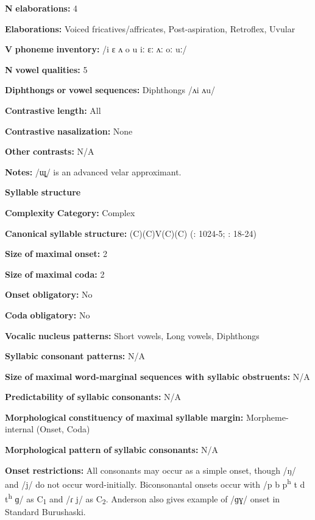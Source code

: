 \begin{styleBody}
\textbf{N} \textbf{elaborations:} 4

\textbf{Elaborations:} Voiced fricatives/affricates, Post-aspiration, Retroflex, Uvular

\textbf{V} \textbf{phoneme} \textbf{inventory:} /i ɛ ʌ o u iː ɛː ʌː oː uː/

\textbf{N} \textbf{vowel} \textbf{qualities:} 5

\textbf{Diphthongs} \textbf{or} \textbf{vowel} \textbf{sequences:} Diphthongs /ʌi ʌu/

\textbf{Contrastive} \textbf{length:} All

\textbf{Contrastive} \textbf{nasalization:} None

\textbf{Other} \textbf{contrasts:} N/A

\textbf{Notes:} /ɰ̟/ is an advanced velar approximant.

\textbf{Syllable} \textbf{structure}

\textbf{Complexity} \textbf{Category:} Complex

\textbf{Canonical} \textbf{syllable} \textbf{structure:} (C)(C)V(C)(C) (\citealt{Anderson1997}: 1024-5; \citealt{Yoshioka2012}: 18-24)

\textbf{Size} \textbf{of} \textbf{maximal} \textbf{onset:} 2

\textbf{Size} \textbf{of} \textbf{maximal} \textbf{coda:} 2

\textbf{Onset} \textbf{obligatory:} No

\textbf{Coda} \textbf{obligatory:} No

\textbf{Vocalic} \textbf{nucleus} \textbf{patterns:} Short vowels, Long vowels, Diphthongs

\textbf{Syllabic} \textbf{consonant} \textbf{patterns:} N/A

\textbf{Size} \textbf{of} \textbf{maximal} \textbf{word{}-marginal sequences with syllabic obstruents:} N/A

\textbf{Predictability} \textbf{of} \textbf{syllabic} \textbf{consonants:} N/A

\textbf{Morphological} \textbf{constituency} \textbf{of} \textbf{maximal} \textbf{syllable} \textbf{margin:} Morpheme-internal (Onset, Coda)

\textbf{Morphological} \textbf{pattern} \textbf{of} \textbf{syllabic} \textbf{consonants:} N/A

\textbf{Onset} \textbf{restrictions:} All consonants may occur as a simple onset, though /ŋ/ and /j/ do not occur word-initially. Biconsonantal onsets occur with /p b p\textsuperscript{h} t d t\textsuperscript{h} ɡ/ as C\textsubscript{1} and /ɾ j/ as C\textsubscript{2}. Anderson also gives example of /ɡɣ/ onset in Standard Burushaski.


\end{styleBody}
